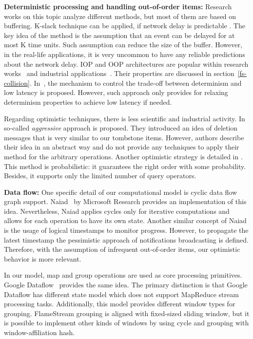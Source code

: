 
\label {fs-related-section}

{\bf Deterministic processing and handling out-of-order items:}
Research works on this topic analyze different methods, but most of them are based on buffering. K-slack technique can be applied, if network delay is predictable \cite{Babu:2004:EKC:1016028.1016032}. The key idea of the method is the assumption that an event can be delayed for at most K time units. Such assumption can reduce the size of the buffer. However, in the real-life applications, it is very uncommon to have any reliable predictions about the network delay. IOP and OOP architectures are popular within research works~\cite{Cranor:2003:GSD:872757.872838, Arasu:2006:CCQ:1146461.1146463, Li:2008:OPN:1453856.1453890} and industrial applications~\cite{carbone2015apache, Akidau:2013:MFS:2536222.2536229}. Their properties are discussed in section~\ref{fs-collision}. In~\cite{Zacheilas:2017:MDS:3093742.3093921}, the mechanism to control the trade-off between determinism and low latency is proposed. However, such approach only provides for relaxing determinism properties to achieve low latency if needed.

Regarding optimistic techniques, there is less scientific and industrial activity. In \cite{Wei:2009:SSO:1559845.1559973} so-called {\it aggressive} approach is proposed. They introduced an idea of deletion messages that is very similar to our tombstone items. However, authors describe their idea in an abstract way and do not provide any techniques to apply their method for the arbitrary operations. Another optimistic strategy is detailed in \cite{Li2011}. This method is probabilistic: it guarantees the right order with some probability. Besides, it supports only the limited number of query operators.

{\bf Data flow:}
One specific detail of our computational model is cyclic data flow graph support. Naiad~\cite{Murray:2013:NTD:2517349.2522738} by Microsoft Research provides an implementation of this idea. Nevertheless, Naiad applies cycles only for iterative computations and allows for each operation to have its own state. Another similar concept of Naiad is the usage of logical timestamps to monitor progress. However, to propagate the latest timestamp the pessimistic approach of notifications broadcasting is defined. Therefore, with the assumption of infrequent out-of-order items, our optimistic behavior is more relevant.

In our model, map and group operations are used as core processing primitives. Google Dataflow~\cite{Akidau:2015:DMP:2824032.2824076} provides the same idea. The primary distinction is that Google Dataflow has different state model which does not support MapReduce stream processing tasks. Additionally, this model provides different window types for grouping. FlameStream grouping is aligned with fixed-sized sliding window, but it is possible to implement other kinds of windows by using cycle and grouping with window-affiliation hash.
